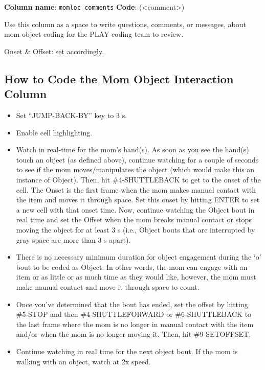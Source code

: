 \documentclass[
  12pt,
]{book}
\providecommand{\tightlist}{%
  \setlength{\itemsep}{0pt}\setlength{\parskip}{0pt}}
\begin{document}
\textbf{Column name}: \texttt{momloc\_comments}
\textbf{Code}: (\textless comment\textgreater)

Use this column as a space to write questions, comments, or messages, about mom object coding for the PLAY coding team to review.

Onset \& Offset: set accordingly.

\hypertarget{how-to-code-the-mom-object-interaction-column}{%
\subsection*{How to Code the Mom Object Interaction Column}\label{how-to-code-the-mom-object-interaction-column}}

\begin{itemize}
\tightlist
\item
  Set ``JUMP-BACK-BY'' key to 3 s.
\item
  Enable cell highlighting.
\item
  Watch in real-time for the mom's hand(s). As soon as you see the hand(s) touch an object (as defined above), continue watching for a couple of seconds to see if the mom moves/manipulates the object (which would make this an instance of Object). Then, hit \#4-SHUTTLEBACK to get to the onset of the cell. The Onset is the first frame when the mom makes manual contact with the item and moves it through space. Set this onset by hitting ENTER to set a new cell with that onset time. Now, continue watching the Object bout in real time and set the Offset when the mom breaks manual contact or stops moving the object for at least 3 s (i.e., Object bouts that are interrupted by gray space are more than 3 s apart).
\item
  There is no necessary minimum duration for object engagement during the `o' bout to be coded as Object. In other words, the mom can engage with an item or as little or as much time as they would like, however, the mom must make manual contact and move it through space to count.
\item
  Once you've determined that the bout has ended, set the offset by hitting \#5-STOP and then \#4-SHUTTLEFORWARD or \#6-SHUTTLEBACK to the last frame where the mom is no longer in manual contact with the item and/or when the mom is no longer moving it. Then, hit \#9-SETOFFSET.
\item
  Continue watching in real time for the next object bout. If the mom is walking with an object, watch at 2x speed.

\end{itemize}
\end{document}
